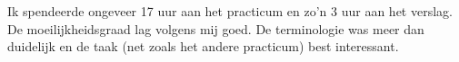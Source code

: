 
Ik spendeerde ongeveer 17 uur aan het practicum en zo'n 3 uur aan het verslag. De moeilijkheidsgraad lag volgens mij goed. De terminologie was meer dan duidelijk en de taak (net zoals het andere practicum) best interessant. 
